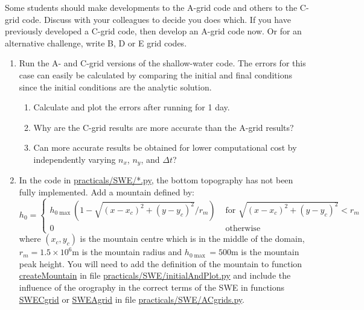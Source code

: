 Some students should make developments to the A-grid code and others
to the C-grid code. Discuss with your colleagues to decide you does
which. If you have previously developed a C-grid code, then develop
an A-grid code now. Or for an alternative challenge, write B, D or
E grid codes. 
\begin{enumerate}
\item Run the A- and C-grid versions of the shallow-water code. The errors
for this case can easily be calculated by comparing the initial and
final conditions since the initial conditions are the analytic solution.

\begin{enumerate}
\item Calculate and plot the errors after running for 1 day.
\item Why are the C-grid results are more accurate than the A-grid results? 
\item Can more accurate results be obtained for lower computational cost
by independently varying $n_{x}$, $n_{y}$, and $\Delta t$?
\end{enumerate}
\item In the code in \url{practicals/SWE/*.py}, the bottom topography has
not been fully implemented. Add a mountain defined by: 
\[
h_{0}=\begin{cases}
h_{0\max}(1-\sqrt{(x-x_{c})^{2}+(y-y_{c})^{2}}/r_{m}) & \text{ for }\sqrt{(x-x_{c})^{2}+(y-y_{c})^{2}}<r_{m}\\
0 & \text{ otherwise}
\end{cases}
\]
where $(x_{c},y_{c})$ is the mountain centre which is in the middle
of the domain, $r_{m}=1.5\times10^{6}\text{m}$ is the mountain radius
and $h_{0\max}=500\text{m}$ is the mountain peak height. You will
need to add the definition of the mountain to function \url{createMountain}
in file \url{practicals/SWE/initialAndPlot.py} and include the influence
of the orography in the correct terms of the SWE in functions \url{SWECgrid}
or \url{SWEAgrid} in file \url{practicals/SWE/ACgrids.py}. 


\end{enumerate}
